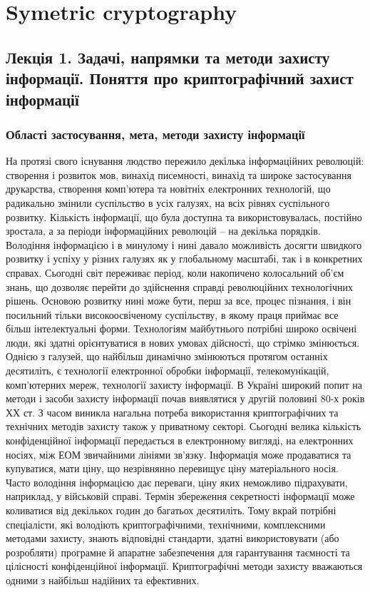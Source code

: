 \chapter{Symetric cryptography}

\section[Задачі, напрямки та методи захисту інформації. Поняття про криптографічний захист інформації]{Лекція 1. Задачі, напрямки та методи захисту інформації. Поняття про криптографічний захист інформації}

\subsection{Області застосування, мета, методи захисту інформації}

На протязі свого існування людство пережило декілька інформаційних
революцій: створення і розвиток мов, винахід писемності, винахід та широке
застосування друкарства, створення комп’ютера та новітніх електронних
технологій, що радикально змінили суспільство в усіх галузях, на всіх рівнях
суспільного розвитку. Кількість інформації, що була доступна та
використовувалась, постійно зростала, а за періоди інформаційних революцій
– на декілька порядків. Володіння інформацією і в минулому і нині давало
можливість досягти швидкого розвитку і успіху у різних галузях як у
глобальному масштабі, так і в конкретних справах. Сьогодні світ переживає
період, коли накопичено колосальний об’єм знань, що дозволяє перейти до
здійснення справді революційних технологічних рішень. Основою розвитку
нині може бути, перш за все, процес пізнання, і він посильний тільки
високоосвіченому суспільству, в якому праця приймає все більш
інтелектуальні форми. Технологіям майбутнього потрібні широко освічені
люди, які здатні орієнтуватися в нових умовах дійсності, що стрімко
змінюється.
Однією з галузей, що найбільш динамічно змінюються протягом
останніх десятиліть, є технології електронної обробки інформації,
телекомунікацій, комп’ютерних мереж, технології захисту інформації.
В Україні широкий попит на методи і засоби захисту інформації почав
виявлятися у другій половині 80-х років ХХ ст. З часом виникла нагальна
потреба використання криптографічних та технічних методів захисту також у
приватному секторі. Сьогодні велика кількість конфіденційної інформації
передається в електронному вигляді, на електронних носіях, між ЕОМ
звичайними лініями зв’язку. Інформація може продаватися та купуватися,
мати ціну, що незрівнянно перевищує ціну матеріального носія. Часто
володіння інформацією дає переваги, ціну яких неможливо підрахувати,
наприклад, у військовій справі. Термін збереження секретності інформації
може коливатися від декількох годин до багатьох десятиліть. Тому вкрай
потрібні спеціалісти, які володіють криптографічними, технічними,
комплексними методами захисту, знають відповідні стандарти, здатні
використовувати (або розробляти) програмне й апаратне забезпечення для
гарантування таємності та цілісності конфіденційної інформації. 
Криптографічні методи захисту вважаються одними з найбільш надійних та
ефективних. 

